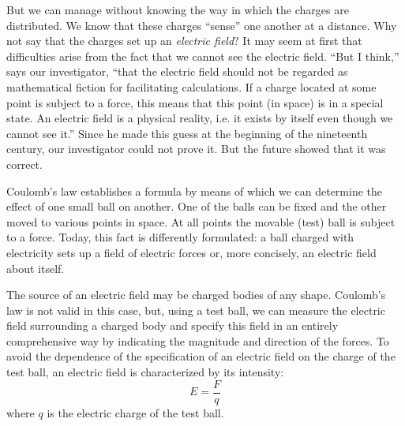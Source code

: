 But we can manage without knowing the way in which the charges are distributed. We know that these charges ``sense'' one another at a distance. Why not say that the charges set up an \emph{electric field}? It may seem at first that difficulties arise from the fact that we cannot see the electric field. ``But I think,'' says our investigator, ``that the electric field should not be regarded as mathematical fiction for facilitating calculations. If a charge located at some point is subject to a force, this means that this point (in space) is in a special state. An electric field is a physical reality, i.e. it exists by itself even though we cannot see it.'' Since he made this guess at the beginning of the nineteenth century, our investigator could not prove it. But the future showed that it was correct.

Coulomb's law establishes a formula by means of which we can determine the effect of one small ball on another. One of the balls can be fixed and the other moved to various points in space. At all points the movable (test) ball is subject to a force. Today, this fact is differently formulated: a ball charged with electricity sets up a field of electric forces or, more concisely, an electric field about itself.

The source of an electric field may be charged bodies of any shape. Coulomb's law is not valid in this case, but, using a test ball, we can measure the electric field surrounding a charged body and specify this field in an entirely comprehensive way by indicating the magnitude and direction of the forces. To avoid the dependence of the specification of an electric field on the charge of the test ball, an electric field is characterized by its intensity:
\begin{equation*}%
E = \frac{F}{q}
\end{equation*}
where $q$ is the electric charge of the test ball.

